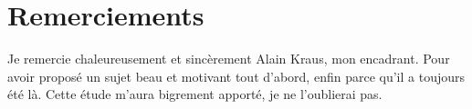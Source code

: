 \section*{Remerciements}

Je remercie chaleureusement et sincèrement Alain Kraus, mon encadrant. Pour avoir proposé un sujet beau et motivant tout d'abord, enfin parce qu'il a toujours été là. Cette étude m'aura bigrement apporté, je ne l'oublierai pas.
